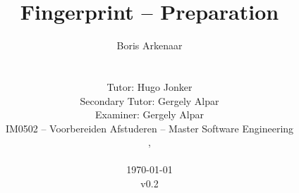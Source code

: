\title{Fingerprint -- Preparation}
\author{
  \alignauthor
  Boris Arkenaar\\
  \\
  \\
  Tutor: Hugo Jonker\\
  Secondary Tutor: Gergely Alpar\\
  Examiner: Gergely Alpar\\
  IM0502 -- Voorbereiden Afstuderen -- Master Software Engineering\\
  ,\\
  \\
  \today\\v0.2}
\maketitle

